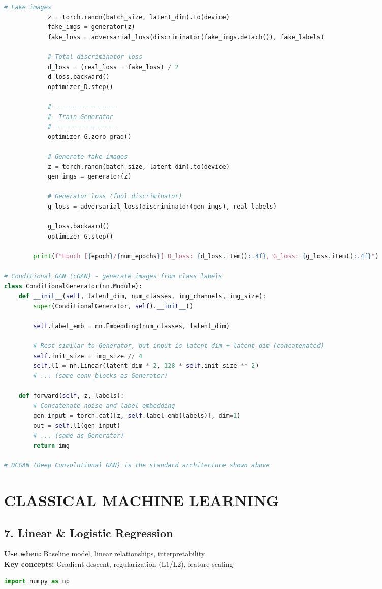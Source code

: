 \documentclass[8pt,landscape]{article}
\begin{document}
\begin{multicols}{3}
\begin{lstlisting}[language=Python]
            # Fake images
            z = torch.randn(batch_size, latent_dim).to(device)
            fake_imgs = generator(z)
            fake_loss = adversarial_loss(discriminator(fake_imgs.detach()), fake_labels)

            # Total discriminator loss
            d_loss = (real_loss + fake_loss) / 2
            d_loss.backward()
            optimizer_D.step()

            # -----------------
            #  Train Generator
            # -----------------
            optimizer_G.zero_grad()

            # Generate fake images
            z = torch.randn(batch_size, latent_dim).to(device)
            gen_imgs = generator(z)

            # Generator loss (fool discriminator)
            g_loss = adversarial_loss(discriminator(gen_imgs), real_labels)

            g_loss.backward()
            optimizer_G.step()

        print(f"Epoch [{epoch}/{num_epochs}] D_loss: {d_loss.item():.4f}, G_loss: {g_loss.item():.4f}")

# Conditional GAN (cGAN) - generate images from class labels
class ConditionalGenerator(nn.Module):
    def __init__(self, latent_dim, num_classes, img_channels, img_size):
        super(ConditionalGenerator, self).__init__()

        self.label_emb = nn.Embedding(num_classes, latent_dim)

        # Rest similar to Generator, but input is latent_dim + latent_dim (concatenated)
        self.init_size = img_size // 4
        self.l1 = nn.Linear(latent_dim * 2, 128 * self.init_size ** 2)
        # ... (same conv_blocks as Generator)

    def forward(self, z, labels):
        # Concatenate noise and label embedding
        gen_input = torch.cat([z, self.label_emb(labels)], dim=1)
        out = self.l1(gen_input)
        # ... (same as Generator)
        return img

# DCGAN (Deep Convolutional GAN) is the standard architecture shown above
\end{lstlisting}

\section*{CLASSICAL MACHINE LEARNING}

\subsection*{7. Linear \& Logistic Regression}
\textbf{Use when:} Baseline model, linear relationships, interpretability \\
\textbf{Key concepts:} Gradient descent, regularization (L1/L2), feature scaling
\begin{lstlisting}[language=Python]
import numpy as np


\end{lstlisting}
\end{multicols}
\end{document}

